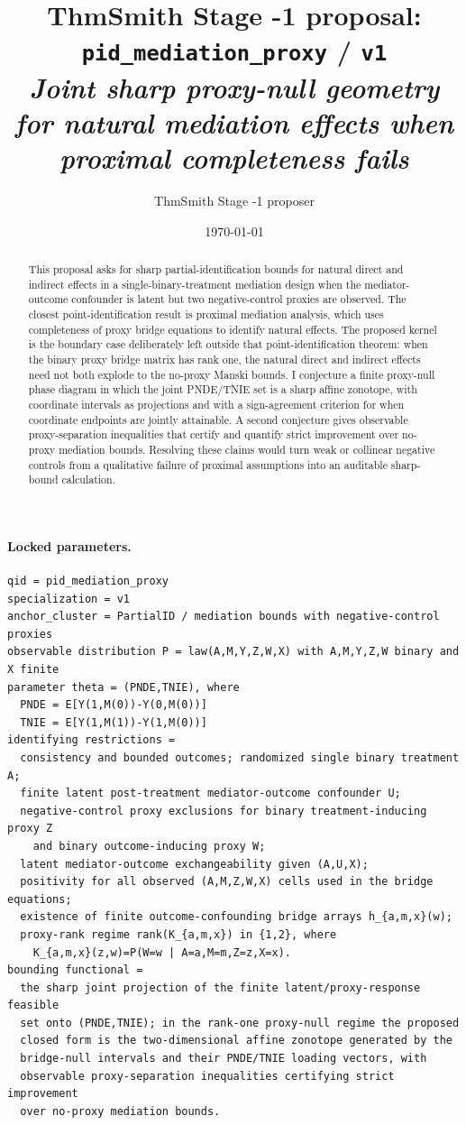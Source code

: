 \documentclass[11pt]{article}
\title{ThmSmith Stage -1 proposal: \texttt{pid\_mediation\_proxy} / \texttt{v1}%
  \\ \large\textit{Joint sharp proxy-null geometry for natural mediation effects when proximal completeness fails}}
\author{ThmSmith Stage -1 proposer}
\date{\today}
\theoremstyle{definition}
\theoremstyle{plain}
\theoremstyle{remark}
\begin{document}
\maketitle


\paragraph{Locked parameters.}
\begin{verbatim}
qid = pid_mediation_proxy
specialization = v1
anchor_cluster = PartialID / mediation bounds with negative-control proxies
observable distribution P = law(A,M,Y,Z,W,X) with A,M,Y,Z,W binary and X finite
parameter theta = (PNDE,TNIE), where
  PNDE = E[Y(1,M(0))-Y(0,M(0))]
  TNIE = E[Y(1,M(1))-Y(1,M(0))]
identifying restrictions =
  consistency and bounded outcomes; randomized single binary treatment A;
  finite latent post-treatment mediator-outcome confounder U;
  negative-control proxy exclusions for binary treatment-inducing proxy Z
    and binary outcome-inducing proxy W;
  latent mediator-outcome exchangeability given (A,U,X);
  positivity for all observed (A,M,Z,W,X) cells used in the bridge equations;
  existence of finite outcome-confounding bridge arrays h_{a,m,x}(w);
  proxy-rank regime rank(K_{a,m,x}) in {1,2}, where
    K_{a,m,x}(z,w)=P(W=w | A=a,M=m,Z=z,X=x).
bounding functional =
  the sharp joint projection of the finite latent/proxy-response feasible
  set onto (PNDE,TNIE); in the rank-one proxy-null regime the proposed
  closed form is the two-dimensional affine zonotope generated by the
  bridge-null intervals and their PNDE/TNIE loading vectors, with
  observable proxy-separation inequalities certifying strict improvement
  over no-proxy mediation bounds.
\end{verbatim}

\begin{abstract}
This proposal asks for sharp partial-identification bounds for natural direct and indirect effects in a single-binary-treatment mediation design when the mediator-outcome confounder is latent but two negative-control proxies are observed.  The closest point-identification result is proximal mediation analysis, which uses completeness of proxy bridge equations to identify natural effects.  The proposed kernel is the boundary case deliberately left outside that point-identification theorem: when the binary proxy bridge matrix has rank one, the natural direct and indirect effects need not both explode to the no-proxy Manski bounds.  I conjecture a finite proxy-null phase diagram in which the joint PNDE/TNIE set is a sharp affine zonotope, with coordinate intervals as projections and with a sign-agreement criterion for when coordinate endpoints are jointly attainable.  A second conjecture gives observable proxy-separation inequalities that certify and quantify strict improvement over no-proxy mediation bounds.  Resolving these claims would turn weak or collinear negative controls from a qualitative failure of proximal assumptions into an auditable sharp-bound calculation.
\end{abstract}
\end{document}
